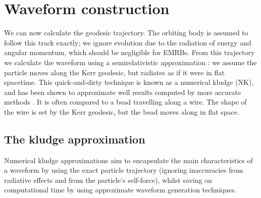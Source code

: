 \section{Waveform construction}\label{sec:Kludge}

We can now calculate the geodesic trajectory. The orbiting body is assumed to follow this track exactly; we ignore evolution due to the radiation of energy and angular momentum, which should be negligible for EMRBs. From this trajectory we calculate the waveform using a semirelativistic approximation \citep{Ruffini1981}: we assume the particle moves along the Kerr geodesic, but radiates as if it were in flat spacetime. This quick-and-dirty technique is known as a numerical kludge (NK), and has been shown to approximate well results computed by more accurate methods \citep{Babak2007}. It is often compared to a bead travelling along a wire. The shape of the wire is set by the Kerr geodesic, but the bead moves along in flat space.

\subsection{The kludge approximation}

Numerical kludge approximations aim to encapsulate the main characteristics of a waveform by using the exact particle trajectory (ignoring inaccuracies from radiative effects and from the particle's self-force), whilst saving on computational time by using approximate waveform generation techniques.

